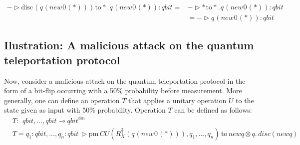 \begin{equation}
  \begin{split}
  - \triangleright \text{disc} \hspace{1pt} (q \hspace{1pt} (\textit{new}\hspace{1pt}0 \hspace{1pt}(*))) \hspace{1pt} \text{to} *. \hspace{1pt} q \hspace{1pt} (\textit{new}\hspace{1pt}0 \hspace{1pt}(*)): \textit{qbit} =& - \triangleright * \hspace{1pt} \text{to} *. \hspace{1pt} q \hspace{1pt} (\textit{new}\hspace{1pt}0 \hspace{1pt}(*)): \textit{qbit}\\
  & = - \triangleright q \hspace{1pt} (\textit{new}\hspace{1pt}0 \hspace{1pt}(*)): \textit{qbit} 
\end{split}
\end{equation}

\subsection{Ilustration: A malicious attack on the quantum teleportation protocol}

Now, consider a malicious attack on the quantum teleportation protocol in the form of a bit-flip occurring with a 50\% probability before measurement.   More generally,  one can define an operation $T$ that applies a unitary operation $U$ to the state given as input with 50\% probability. Operation $T$ can be defined as follows:
\begin{equation*}
\begin{split}
  &T: \hspace{5pt} \textit{qbit},...,\textit{qbit}  \multimap \textit{qbit}^{\otimes n} \\
  &T= q_{1}:\textit{qbit},...,q_{n}:\textit{qbit} \hspace{2pt}\triangleright \text{pm} \hspace{2pt} CU ( R_{X}^{\frac{\pi}{2}} (q \hspace{1pt} (\textit{new}\hspace{1pt}0 \hspace{1pt}(*))) ,q_{1},...,q_{n}) \hspace{2pt} \text{to} \hspace{2pt} newq \otimes q. \hspace{2pt} \textit{disc} (newq) 
\end {split}
\end{equation*}

